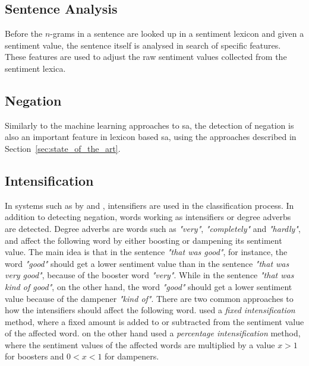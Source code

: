 \subsection{Sentence Analysis}
Before the $n$-grams in a sentence are looked up in a sentiment lexicon and given a sentiment value, the sentence itself is analysed in search of specific features. These features are used to adjust the raw sentiment values collected from the sentiment lexica.


\subsection*{Negation} 
Similarly to the machine learning approaches to \ac{sa}, the detection of negation is also an important feature in lexicon based \ac{sa}, using the approaches described in Section~\ref{sec:state_of_the_art}.


\subsection*{Intensification}
In systems such as by \cite{vaderSentiment} and \cite{Taboada2011}, intensifiers are used in the classification process. In addition to detecting negation, words working as intensifiers or degree adverbs are detected. Degree adverbs are words such as \textit{"very"}, \textit{"completely"} and \textit{"hardly"}, and affect the following word by either boosting or dampening its sentiment value. The main idea is that in the sentence \textit{"that was good"}, for instance, the word \textit{"good"} should get a lower sentiment value than in the sentence \textit{"that was very good"}, because of the booster word \textit{"very"}. While in the sentence \textit{"that was kind of good"}, on the other hand, the word \textit{"good"} should get a lower sentiment value because of the dampener \textit{"kind of"}. There are two common approaches to how the intensifiers should affect the following word. \cite{Polanyi06} used a \textit{fixed intensification} method, where a fixed amount is added to or subtracted from the sentiment value of the affected word. \cite{Taboada2011} on the other hand used a \textit{percentage intensification} method, where the sentiment values of the affected words are multiplied by a value $x>1$ for boosters and $0<x<1$ for dampeners.  


